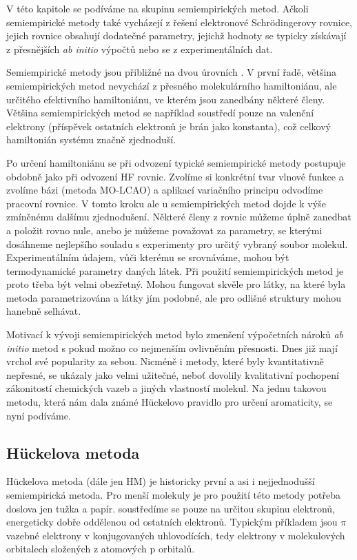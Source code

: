V této kapitole se podíváme na skupinu semiempirických metod. Ačkoli semiempirické metody také vycházejí z řešení elektronové Schr\"{o}dingerovy rovnice, jejich rovnice obsahují dodatečné parametry, jejichž hodnoty se typicky získávají z přesnějších \textit{ab initio} výpočtů nebo se z experimentálních dat.

Semiempirické metody jsou přibližné na dvou úrovních . V první řadě, většina semiempirických metod nevychází z přesného molekulárního hamiltoniánu, ale určitého efektivního hamiltoniánu, ve kterém jsou zanedbány některé členy. Většina semiempirických metod se například soustředí pouze na valenční elektrony (příspěvek ostatních elektronů je brán jako konstanta), což celkový hamiltonián systému značně zjednoduší. 

Po určení hamiltoniánu se při odvození typické semiempirické metody postupuje obdobně jako při odvození HF rovnic. Zvolíme si konkrétní tvar vlnové funkce a zvolíme bázi (metoda MO-LCAO) a aplikací variačního principu odvodíme pracovní rovnice. V tomto kroku ale u semiempirických metod dojde k výše zmíněnému dalšímu zjednodušení. Některé členy z rovnic můžeme úplně zanedbat a položit rovno nule, anebo je můžeme považovat za parametry, se kterými dosáhneme nejlepšího souladu s experimenty pro určitý vybraný soubor molekul. Experimentálním údajem, vůči kterému se srovnáváme, mohou být termodynamické parametry daných látek. Při použití semiempirických metod je proto třeba být velmi obezřetný. Mohou fungovat skvěle pro látky, na které byla metoda parametrizována a látky jím podobné, ale pro odlišné struktury mohou hanebně selhávat.

Motivací k vývoji semiempirických metod bylo zmenšení výpočetních nároků \textit{ab initio} metod s pokud možno co nejmenším ovlivněním přesnosti. Dnes již mají vrchol své popularity za sebou. Nicméně i metody, které byly kvantitativně nepřesné, se ukázaly jako velmi užitečné, neboť dovolily kvalitativní pochopení zákonitostí chemických vazeb a jiných vlastností molekul. Na jednu takovou metodu, která nám dala známé H\"{u}ckelovo pravidlo  pro určení aromaticity, se nyní podíváme.

\subsection{H\"{u}ckelova metoda}

H\"{u}ckelova metoda (dále jen HM) je historicky první a asi i nejjednodušší semiempirická metoda. Pro menší molekuly je pro použití této metody potřeba doslova jen tužka a papír. soustředíme se pouze na určitou skupinu elektronů, energeticky dobře oddělenou od ostatních elektronů. Typickým příkladem jsou $\pi$ vazebné elektrony v konjugovaných uhlovodících,
tedy elektrony v molekulových orbitalech složených z atomových p orbitalů.
 

